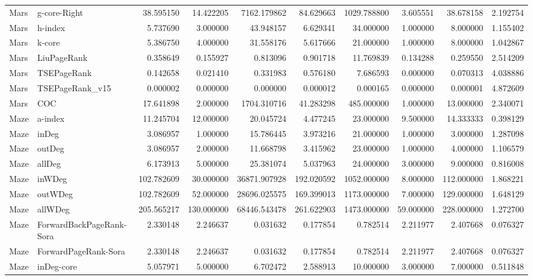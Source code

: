 \begin{tabular}{llrrrrrrrr}
Mars & g-core-Right & 38.595150 & 14.422205 & 7162.179862 & 84.629663 & 1029.788800 & 3.605551 & 38.678158 & 2.192754 \\
Mars & h-index & 5.737690 & 3.000000 & 43.948157 & 6.629341 & 34.000000 & 1.000000 & 8.000000 & 1.155402 \\
Mars & k-core & 5.386750 & 4.000000 & 31.558176 & 5.617666 & 21.000000 & 1.000000 & 8.000000 & 1.042867 \\
Mars & LiuPageRank & 0.358649 & 0.155927 & 0.813096 & 0.901718 & 11.769839 & 0.134288 & 0.259550 & 2.514209 \\
Mars & TSEPageRank & 0.142658 & 0.021410 & 0.331983 & 0.576180 & 7.686593 & 0.000000 & 0.070313 & 4.038886 \\
Mars & TSEPageRank_v15 & 0.000002 & 0.000000 & 0.000000 & 0.000012 & 0.000165 & 0.000000 & 0.000001 & 4.872609 \\
Mars & COC & 17.641898 & 2.000000 & 1704.310716 & 41.283298 & 485.000000 & 1.000000 & 13.000000 & 2.340071 \\
Maze & a-index & 11.245704 & 12.000000 & 20.045724 & 4.477245 & 23.000000 & 9.500000 & 14.333333 & 0.398129 \\
Maze & inDeg & 3.086957 & 1.000000 & 15.786445 & 3.973216 & 21.000000 & 1.000000 & 3.000000 & 1.287098 \\
Maze & outDeg & 3.086957 & 2.000000 & 11.668798 & 3.415962 & 23.000000 & 1.000000 & 4.000000 & 1.106579 \\
Maze & allDeg & 6.173913 & 5.000000 & 25.381074 & 5.037963 & 24.000000 & 3.000000 & 9.000000 & 0.816008 \\
Maze & inWDeg & 102.782609 & 30.000000 & 36871.907928 & 192.020592 & 1052.000000 & 8.000000 & 112.000000 & 1.868221 \\
Maze & outWDeg & 102.782609 & 52.000000 & 28696.025575 & 169.399013 & 1173.000000 & 7.000000 & 129.000000 & 1.648129 \\
Maze & allWDeg & 205.565217 & 130.000000 & 68446.543478 & 261.622903 & 1473.000000 & 59.000000 & 228.000000 & 1.272700 \\
Maze & ForwardBackPageRank-Sora & 2.330148 & 2.246637 & 0.031632 & 0.177854 & 0.782514 & 2.211977 & 2.407668 & 0.076327 \\
Maze & ForwardPageRank-Sora & 2.330148 & 2.246637 & 0.031632 & 0.177854 & 0.782514 & 2.211977 & 2.407668 & 0.076327 \\
Maze & inDeg-core & 5.057971 & 5.000000 & 6.702472 & 2.588913 & 10.000000 & 3.000000 & 7.000000 & 0.511848 \\

\end{tabular}
